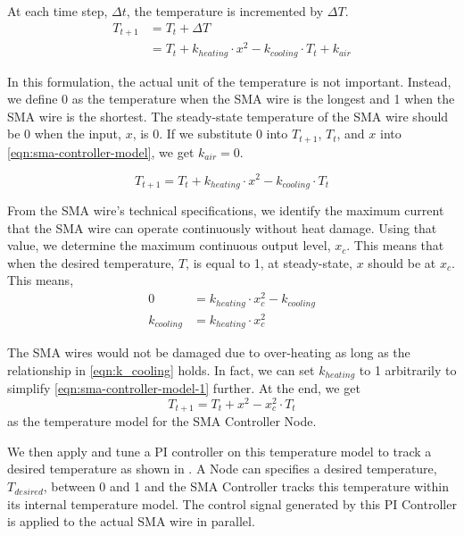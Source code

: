 At each time step, $\Delta t$, the temperature is incremented by $\Delta T$.  
\begin{subequations}
	\begin{flalign}
	T_{t+1} &=  T_{t} + \Delta T \\
		    &=  T_{t} + k_{heating} \cdot x^2 - k_{cooling} \cdot T_{t}  + k_{air}\label{eqn:sma-controller-model}
	\end{flalign}
\end{subequations}

In this formulation, the actual unit of the temperature is not important. Instead, we define 0 as the temperature when the SMA wire is the longest and 1 when the SMA wire is the shortest. The steady-state temperature of the SMA wire should be 0 when the input, $x$, is 0. If we substitute 0 into $T_{t+1}$, $T_{t}$, and $x$ into \eqref{eqn:sma-controller-model}, we get $k_{air} = 0$. 

\begin{equation}\label{eqn:sma-controller-model-1}
T_{t+1} =  T_{t} + k_{heating} \cdot x^2 - k_{cooling} \cdot T_{t}
\end{equation}

From the SMA wire's technical specifications\cite{FlexinolTechSpecs}, we identify the maximum current that the SMA wire can operate continuously without heat damage. Using that value, we determine the maximum continuous output level, $x_c$. This means that when the desired temperature, $T$, is equal to 1, at steady-state, $x$ should be at $x_c$. This means, 
\begin{subequations}
	\begin{flalign}
	 0 &= k_{heating} \cdot x_c^2 - k_{cooling} \\
	 k_{cooling} &=  k_{heating} \cdot x_c^2\label{eqn:k_cooling}
	\end{flalign}
\end{subequations}

The SMA wires would not be damaged due to over-heating as long as the relationship in \eqref{eqn:k_cooling} holds. In fact, we can set $k_{heating}$ to 1 arbitrarily to simplify \eqref{eqn:sma-controller-model-1} further. At the end, we get
\begin{equation}\label{eqn:sma-controller-model-2}
	T_{t+1} =  T_{t} + x^2 -  x_c^2 \cdot T_{t}
\end{equation}
as the temperature model for the SMA Controller Node.

We then apply and tune a PI controller on this temperature model to track a desired temperature as shown in . A Node can specifies a desired temperature, $T_{desired}$, between 0 and 1 and the SMA Controller tracks this temperature within its internal temperature model. The control signal generated by this PI Controller is applied to the actual SMA wire in parallel. 

